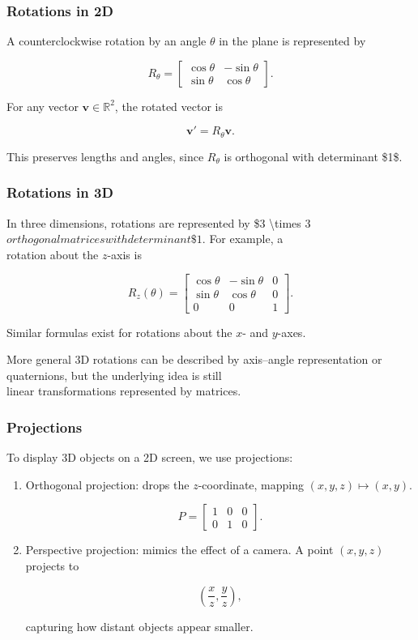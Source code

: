 \documentclass[
  12pt,
  a4paper,
]{article}
\begin{document}
\subsubsection{Rotations in 2D}\label{rotations-in-2d}

A counterclockwise rotation by an angle \(\theta\) in the plane is
represented by

\[R_\theta =
\begin{bmatrix}
\cos\theta & -\sin\theta \\
\sin\theta & \cos\theta
\end{bmatrix}.\]

For any vector \(\mathbf{v} \in \mathbb{R}^2\), the rotated vector is

\[\mathbf{v}' = R_\theta \mathbf{v}.\]

This preserves lengths and angles, since \(R_\theta\) is orthogonal with
determinant \$1\$.

\subsubsection{Rotations in 3D}\label{rotations-in-3d}

In three dimensions, rotations are represented by \$3
\textbackslash times 3\( orthogonal matrices with determinant \$1\). For
example, a\\
rotation about the \(z\)-axis is

\[R_z(\theta) =
\begin{bmatrix}
\cos\theta & -\sin\theta & 0 \\
\sin\theta & \cos\theta & 0 \\
0 & 0 & 1
\end{bmatrix}.\]

Similar formulas exist for rotations about the \(x\)- and \(y\)-axes.

More general 3D rotations can be described by axis--angle representation
or quaternions, but the underlying idea is still\\
linear transformations represented by matrices.

\subsubsection{Projections}\label{projections-2}

To display 3D objects on a 2D screen, we use projections:

\begin{enumerate}
\def\labelenumi{\arabic{enumi}.}
\item
  Orthogonal projection: drops the \(z\)-coordinate, mapping
  \((x,y,z) \mapsto (x,y)\).

  \[P = \begin{bmatrix}
  1 & 0 & 0 \\
  0 & 1 & 0
  \end{bmatrix}.\]
\item
  Perspective projection: mimics the effect of a camera. A point
  \((x,y,z)\) projects to

  \[\left(\frac{x}{z}, \frac{y}{z}\right),\]

  capturing how distant objects appear smaller.
\end{enumerate}
\end{document}

